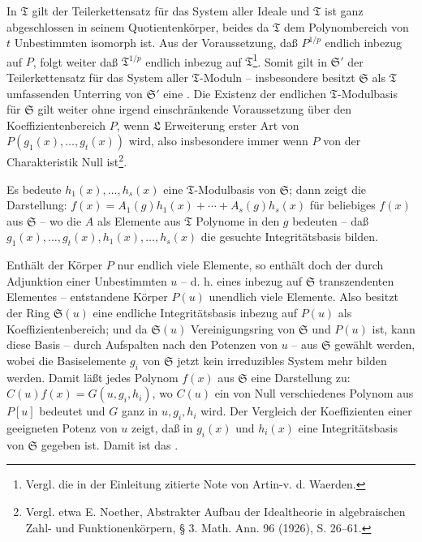 In $\mathfrak T$ gilt der Teilerkettensatz für das System aller Ideale und $\mathfrak T$ ist ganz abgeschlossen in seinem Quotientenkörper, beides da $\mathfrak T$ dem Polynombereich von $t$ Unbestimmten isomorph ist. Aus der Voraussetzung, daß $P^{1/p}$ endlich inbezug auf $P$, folgt weiter daß $\mathfrak T^{1/p}$ endlich inbezug auf $\mathfrak T$\footnote{Vergl. die in der Einleitung zitierte Note von Artin-v. d. Waerden.}. Somit gilt in $\mathfrak S'$ der Teilerkettensatz für das System aller $\mathfrak T$-Moduln -- insbesondere besitzt $\mathfrak S$ als $\mathfrak T$ umfassenden Unterring von $\mathfrak S'$ eine \footnotemark[\value{footnote}]. Die Existenz der endlichen $\mathfrak T$-Modulbasis für $\mathfrak S$ gilt weiter ohne irgend einschränkende Voraussetzung über den Koeffizientenbereich $P$, wenn $\mathfrak L$ Erweiterung erster Art von $P(g_1(x),\ldots,g_t(x))$ wird, also insbesondere immer wenn $P$ von der Charakteristik Null ist\footnote{Vergl. etwa E. Noether, Abstrakter Aufbau der Idealtheorie in algebraischen Zahl- und Funktionenkörpern, § 3. Math. Ann. 96 (1926), S. 26--61.}.

Es bedeute $h_1(x),\ldots,h_s(x)$ eine $\mathfrak T$-Modulbasis von $\mathfrak S$; dann zeigt die Darstellung: $f(x)=A_1(g)h_1(x)+\cdots+A_s(g)h_s(x)$ für beliebiges $f(x)$ aus $\mathfrak S$ -- wo die $A$ als Elemente aus $\mathfrak T$ Polynome in den $g$ bedeuten -- daß $g_1(x),\ldots,g_t(x),h_1(x),\ldots,h_s(x)$ die gesuchte Integritätsbasis bilden.

Enthält der Körper $P$ nur endlich viele Elemente, so enthält doch der durch Adjunktion einer Unbestimmten $u$ -- d. h. eines inbezug auf $\mathfrak S$ transzendenten Elementes -- entstandene Körper $P(u)$ unendlich viele Elemente. Also besitzt der Ring $\mathfrak S(u)$ eine endliche Integritätsbasis inbezug auf $P(u)$ als Koeffizientenbereich; und da $\mathfrak S(u)$ Vereinigungsring von $\mathfrak S$ und $P(u)$ ist, kann diese Basis -- durch Aufspalten nach den Potenzen von $u$ -- aus $\mathfrak S$ gewählt werden, wobei die Basiselemente $g_i$ von $\mathfrak S$ jetzt kein irreduzibles System mehr bilden werden. Damit läßt jedes Polynom $f(x)$ aus $\mathfrak S$ eine Darstellung zu: $C(u)f(x)=G(u,g_i,h_i)$, wo $C(u)$ ein von Null verschiedenes Polynom aus $P[u]$ bedeutet und $G$ ganz in $u,g_i,h_i$ wird. Der Vergleich der Koeffizienten einer geeigneten Potenz von $u$ zeigt, daß in $g_i(x)$ und $h_i(x)$ eine Integritätsbasis von $\mathfrak S$ gegeben ist. Damit ist das .

